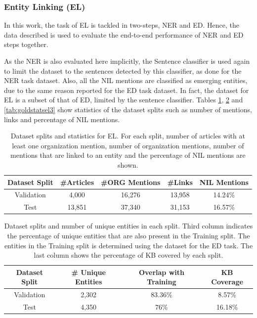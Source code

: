 \documentclass{report}
\theoremstyle{definition}
\theoremstyle{remark}
\begin{document}
\subsubsection{Entity Linking (EL)}
In this work, the task of EL is tackled in two-steps, NER and ED. Hence, the data described is used to evaluate the end-to-end performance of NER and ED steps together. 

As the NER is also evaluated here implicitly, the Sentence classifier is used again to limit the dataset to the sentences detected by this classifier, as done for the NER task dataset. Also, all the NIL mentions are classified as emerging entities, due to the same reason reported for the ED task dataset. In fact, the dataset for EL is a subset of that of ED, limited by the sentence classifier. Tables \ref{tab:goldstatsel}, \ref{tab:goldstatsel2} and \ref{tab:goldstatsel3} show statistics of the dataset splits such as number of mentions, links and percentage of NIL mentions.

\begin{table}[H]
    \centering
    \begin{tabular}{ccccc}
     Dataset Split & \#Articles & \#ORG Mentions & \#Links & NIL Mentions  \\
     \hline
    Validation & 4,000  & 16,276 & 13,958 & 14.24\% \\
    Test           & 13,851 & 37,340 & 31,153 & 16.57\% \\
    \end{tabular}
    \caption{Dataset splits and statistics for EL. For each split, number of articles with at least one organization mention, number of organization mentions, number of mentions that are linked to an entity and the percentage of NIL mentions are shown.}
    \label{tab:goldstatsel}
\end{table}


\begin{table}[H]
    \centering
    \begin{tabular}{cccc}
    Dataset Split & \# Unique Entities & Overlap with Training & KB Coverage\\
    \hline
    Validation & 2,302 & 83.36\% & 8.57\%\\
    Test & 4,350 & 76\%& 16.18\%\\
    \end{tabular}
    \caption{Dataset splits and number of unique entities in each split. Third column indicates the percentage of unique entities that are also present in the Training split. The entities in the Training split is determined using the dataset for the ED task. The last column shows the percentage of KB covered by each split.}
    \label{tab:goldstatsel2}
\end{table}
\end{document}
